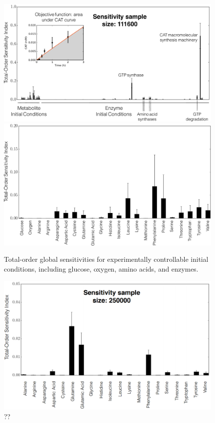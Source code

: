 \documentclass[12pt]{article}
\begin{document}
\begin{figure}[ht]
\centering
\includegraphics[width=1.00\textwidth]{./Figures/Sensitivity.pdf}
\includegraphics[width=1.00\textwidth]{./Figures/Metab_sensitivity.pdf}
\caption{Total-order global sensitivities for experimentally controllable initial conditions, including glucose, oxygen, amino acids, and enzymes.}
\label{fig:GlobalSensitivity}
\end{figure}

\begin{figure}[ht]
\centering
\includegraphics[width=1.00\textwidth]{./Figures/All_Unbound.png}
\caption{??}
\label{fig:All_Unbound}
\end{figure}
\end{document}

